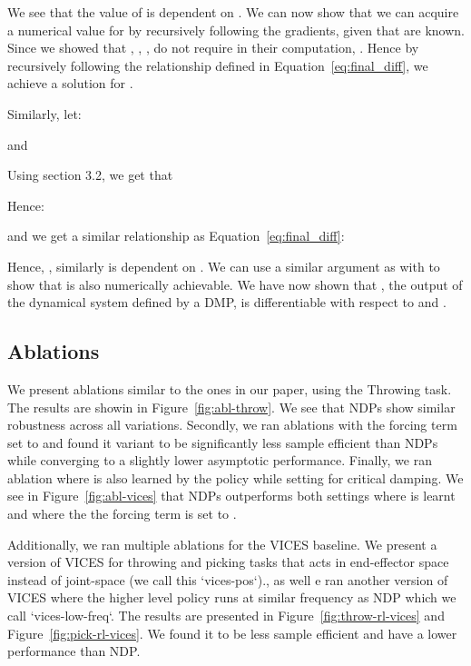 \documentclass{article}
\newcommand{\our}{NDP\xspace}
\newcommand{\ours}{NDPs\xspace}
\begin{document}
We see that the value of  is dependent on . We can now show that we can acquire a numerical value for  by recursively following the gradients, given that  are known. Since we showed that , , , do not require  in their computation, . Hence by recursively following the relationship defined in Equation~\eqref{eq:final_diff}, we achieve a solution for . 

Similarly, let: 


and 


Using section 3.2, we get that


Hence: 


and we get a similar relationship as Equation~\eqref{eq:final_diff}: 


Hence, , similarly is dependent on . We can use a similar argument as with  to show that  is also numerically achievable. We have now shown that , the output of the dynamical system defined by a DMP, is differentiable with respect to  and .


\subsection{Ablations}
We present ablations similar to the ones in our paper, using the Throwing task. The results are showin in Figure~\ref{fig:abl-throw}. We see that \ours show similar robustness across all variations. Secondly, we ran ablations with the forcing term set to  and found it variant to be significantly less sample efficient than NDPs while converging to a slightly lower asymptotic performance. Finally, we ran ablation where  is also learned by the policy while setting  for critical damping. We see in Figure~\ref{fig:abl-vices} that \ours outperforms both settings where  is learnt and where the the forcing term  is set to . 

Additionally, we ran multiple ablations for the VICES baseline. We present a version of VICES  for throwing and picking tasks that acts in end-effector space instead of joint-space (we call this `vices-pos`)., as well 
e ran another version of VICES where the higher level policy runs at similar frequency as NDP which we call `vices-low-freq`. The results are presented in Figure~\ref{fig:throw-rl-vices} and Figure~\ref{fig:pick-rl-vices}. We found it to be less sample efficient and have a lower performance than \our. 
\end{document}
